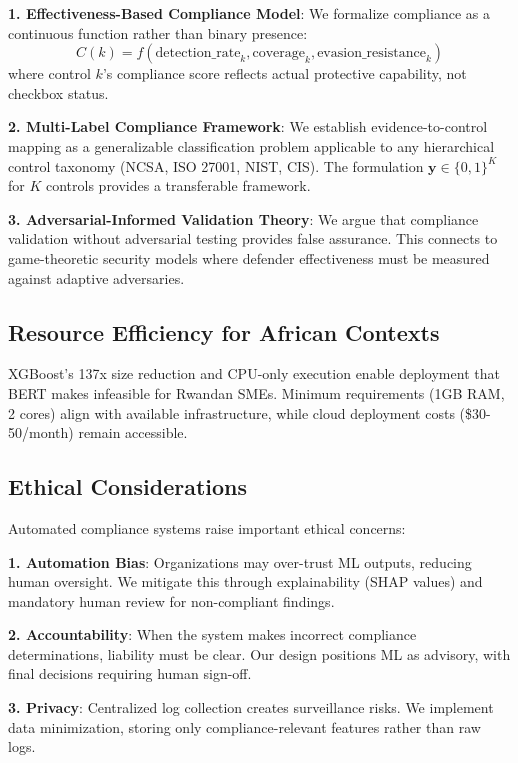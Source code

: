 \documentclass[11pt,conference]{IEEEtran}
\begin{document}
\textbf{1. Effectiveness-Based Compliance Model}: We formalize compliance as a continuous function rather than binary presence:
\begin{equation}
C(k) = f(\text{detection\_rate}_k, \text{coverage}_k, \text{evasion\_resistance}_k)
\end{equation}
where control $k$'s compliance score reflects actual protective capability, not checkbox status.

\textbf{2. Multi-Label Compliance Framework}: We establish evidence-to-control mapping as a generalizable classification problem applicable to any hierarchical control taxonomy (NCSA, ISO 27001, NIST, CIS). The formulation $\mathbf{y} \in \{0,1\}^K$ for $K$ controls provides a transferable framework.

\textbf{3. Adversarial-Informed Validation Theory}: We argue that compliance validation without adversarial testing provides false assurance. This connects to game-theoretic security models where defender effectiveness must be measured against adaptive adversaries.

\subsection{Resource Efficiency for African Contexts}

XGBoost's 137x size reduction and CPU-only execution enable deployment that BERT makes infeasible for Rwandan SMEs. Minimum requirements (1GB RAM, 2 cores) align with available infrastructure, while cloud deployment costs (\$30-50/month) remain accessible.

\subsection{Ethical Considerations}

Automated compliance systems raise important ethical concerns:

\textbf{1. Automation Bias}: Organizations may over-trust ML outputs, reducing human oversight. We mitigate this through explainability (SHAP values) and mandatory human review for non-compliant findings.

\textbf{2. Accountability}: When the system makes incorrect compliance determinations, liability must be clear. Our design positions ML as advisory, with final decisions requiring human sign-off.

\textbf{3. Privacy}: Centralized log collection creates surveillance risks. We implement data minimization, storing only compliance-relevant features rather than raw logs.
\end{document}
